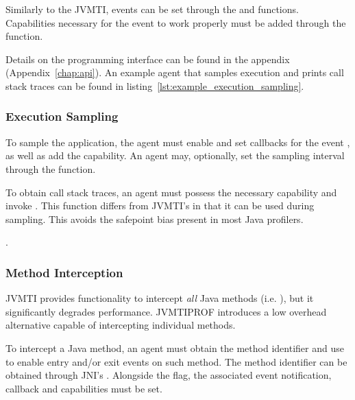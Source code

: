 Similarly to the JVMTI, events can be set through the  and  functions. Capabilities necessary for the event to work properly must be added through the  function.

Details on the programming interface can be found in the appendix (Appendix~\ref{chap:api}). An example agent that samples execution and prints call stack traces can be found in listing~\ref{lst:example_execution_sampling}.

\subsubsection*{Execution Sampling}

To sample the application, the agent must enable and set callbacks for the event , as well as add the  capability. An agent may, optionally, set the sampling interval through the  function.


To obtain call stack traces, an agent must possess the necessary capability and invoke . This function differs from JVMTI's  in that it can be used during sampling. This avoids the safepoint bias present in most Java profilers.


.

\subsubsection*{Method Interception}

JVMTI provides functionality to intercept \emph{all} Java methods (i.e. ), but it significantly degrades performance. JVMTIPROF introduces a low overhead alternative capable of intercepting individual methods.

To intercept a Java method, an agent must obtain the method identifier and use  to enable entry and/or exit events on such method. The method identifier can be obtained through JNI's . Alongside the flag, the associated event notification, callback and capabilities must be set.

